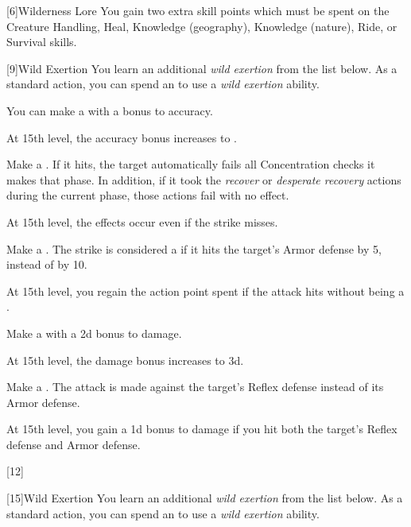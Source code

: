         [6]{Wilderness Lore} You gain two extra skill points which must be spent on the Creature Handling, Heal, Knowledge (geography), Knowledge (nature), Ride, or Survival skills.

        [9]{Wild Exertion}
        You learn an additional \textit{wild exertion} from the list below.
        As a standard action, you can spend an  to use a \textit{wild exertion} ability.
        {
             You can make a  with a  bonus to accuracy.

            \par At 15th level, the accuracy bonus increases to .

             Make a .
            If it hits, the target automatically fails all Concentration checks it makes that phase.
            In addition, if it took the \textit{recover} or \textit{desperate recovery} actions during the current phase, those actions fail with no effect.

            \par At 15th level, the effects occur even if the strike misses.

             Make a .
            The strike is considered a  if it hits the target's Armor defense by 5, instead of by 10.

            \par At 15th level, you regain the action point spent if the attack hits without being a .

             Make a  with a \plus2d bonus to damage.

            \par At 15th level, the damage bonus increases to \plus3d.

             Make a .
            The attack is made against the target's Reflex defense instead of its Armor defense.

            \par At 15th level, you gain a \plus1d bonus to damage if you hit both the target's Reflex defense and Armor defense.
        }

        [12]{} 

        [15]{Wild Exertion} 
        You learn an additional \textit{wild exertion} from the list below.
        As a standard action, you can spend an  to use a \textit{wild exertion} ability.
        {
        }

